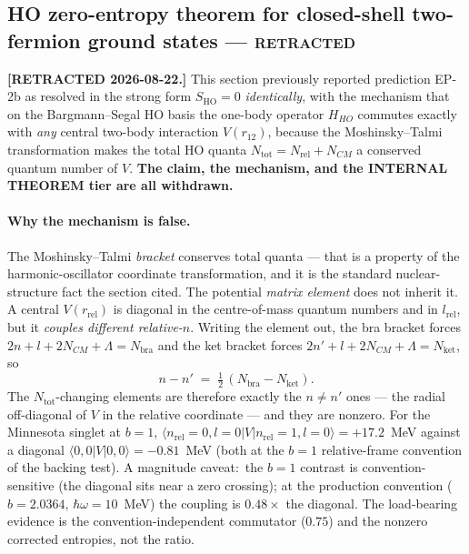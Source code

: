 \documentclass[twocolumn,pra,amsmath,amssymb,superscriptaddress]{revtex4-2}
\begin{document}
\subsection{HO zero-entropy theorem for closed-shell
            two-fermion ground states --- \textsc{retracted}}
\label{sec:pred1}

\textbf{[RETRACTED 2026-08-22.]}  This section previously reported
prediction EP-2b as resolved in the strong form
$S_{\mathrm{HO}} = 0$ \emph{identically}, with the mechanism that on
the Bargmann--Segal HO basis the one-body operator $H_{HO}$ commutes
exactly with \emph{any} central two-body interaction $V(r_{12})$,
because the Moshinsky--Talmi transformation makes the total HO quanta
$N_{\mathrm{tot}} = N_{\mathrm{rel}} + N_{CM}$ a conserved quantum
number of $V$.  \textbf{The claim, the mechanism, and the INTERNAL
THEOREM tier are all withdrawn.}

\paragraph*{Why the mechanism is false.}  The Moshinsky--Talmi
\emph{bracket} conserves total quanta --- that is a property of the
harmonic-oscillator coordinate transformation, and it is the standard
nuclear-structure fact the section cited.  The potential \emph{matrix
element} does not inherit it.  A central $V(r_{\mathrm{rel}})$ is
diagonal in the centre-of-mass quantum numbers and in
$l_{\mathrm{rel}}$, but it \emph{couples different relative-$n$}.
Writing the element out, the bra bracket forces
$2n + l + 2N_{CM} + \Lambda = N_{\mathrm{bra}}$ and the ket bracket
forces $2n' + l + 2N_{CM} + \Lambda = N_{\mathrm{ket}}$, so
\begin{equation}
  n - n' \;=\; \tfrac{1}{2}\,(N_{\mathrm{bra}} - N_{\mathrm{ket}}).
  \label{eq:n_shift}
\end{equation}
The $N_{\mathrm{tot}}$-changing elements are therefore exactly the
$n \neq n'$ ones --- the radial off-diagonal of $V$ in the relative
coordinate --- and they are nonzero.  For the Minnesota singlet at
$b=1$,
$\langle n_{\mathrm{rel}}{=}0, l{=}0 \lvert V \rvert
 n_{\mathrm{rel}}{=}1, l{=}0 \rangle = +17.2$~MeV against a diagonal
$\langle 0,0 \lvert V \rvert 0,0 \rangle = -0.81$~MeV (both at the
$b{=}1$ relative-frame convention of the backing test).  A magnitude
caveat:\ the $b{=}1$ contrast is convention-sensitive (the
diagonal sits near a zero crossing); at the production convention
($b = 2.0364$, $\hbar\omega = 10$~MeV) the coupling is $0.48\times$ the
diagonal.  The load-bearing evidence is the convention-independent
commutator ($0.75$) and the nonzero corrected entropies, not the ratio.
\end{document}

